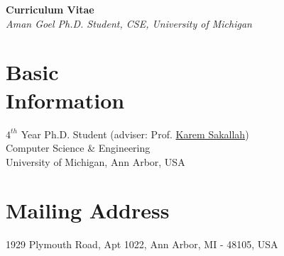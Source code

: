 \documentclass[margin,line,letter]{resume}
\begin{document}
{\sc \LARGE \phantom{xx}\hspace{22ex} \textbf{Curriculum Vitae} 
\vspace{0.3cm}
\\
\large \emph{Aman Goel \phantom{x}\hspace{0.5ex} \phantom{x}\hspace{0.7ex} Ph.D. Student, CSE, University of Michigan}}
\begin{resume}
    

\section{\mysidestyle Basic\\Information}
    $4^{th}$ Year Ph.D. Student (adviser: Prof. \href{http://web.eecs.umich.edu/~karem/}{Karem Sakallah})                 \hspace{.078\textwidth Phone: \hfill +1-734-881-0674} \\
    Computer Science \& Engineering      \\
    University of Michigan, Ann Arbor, USA      
    
\section{\mysidestyle Mailing Address}
    1929 Plymouth Road, Apt 1022, Ann Arbor, MI - 48105, USA


\end{resume}
\end{document}
